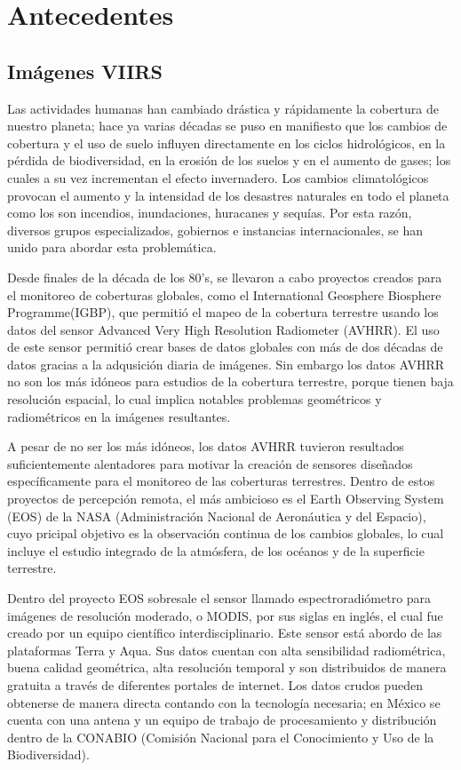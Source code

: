 \chapter{Antecedentes}

\section{Imágenes VIIRS}

Las actividades humanas han cambiado drástica y rápidamente la cobertura de nuestro planeta; hace ya varias décadas se puso en manifiesto que los cambios de cobertura y el uso de suelo influyen directamente en los ciclos hidrológicos, en la pérdida de biodiversidad, en la erosión de los suelos y en el aumento de gases; los cuales a su vez incrementan el efecto invernadero. Los cambios climatológicos provocan el aumento y la intensidad de los desastres naturales en todo el planeta como los son incendios, inundaciones, huracanes y sequías. Por esta razón, diversos grupos especializados, gobiernos e instancias internacionales, se han unido para abordar esta problemática. 

Desde finales de la década de los 80's, se llevaron a cabo proyectos creados para el monitoreo de coberturas globales, como el International Geosphere Biosphere Programme(IGBP), que permitió el mapeo de la cobertura terrestre usando los datos del sensor Advanced Very High Resolution Radiometer (AVHRR). El uso de este sensor permitió crear bases de datos globales con más de dos décadas de datos gracias a la adqusición diaria de imágenes. Sin embargo los datos AVHRR no son los más idóneos para estudios de la cobertura terrestre, porque tienen baja resolución espacial, lo cual implica notables problemas geométricos y radiométricos en la imágenes resultantes. 

A pesar de no ser los más idóneos, los datos AVHRR tuvieron resultados suficientemente alentadores para motivar la creación de sensores diseñados específicamente para el monitoreo de las coberturas terrestres. Dentro de estos proyectos de percepción remota, el más ambicioso es el Earth Observing System (EOS) de la NASA (Administración Nacional de Aeronáutica y del Espacio), cuyo pricipal objetivo es la observación continua de los cambios globales, lo cual incluye el estudio integrado de la atmósfera, de los océanos y de la superficie terrestre. 

Dentro del proyecto EOS sobresale el sensor llamado espectroradiómetro para imágenes de resolución moderado, o MODIS, por sus siglas en inglés, el cual fue creado por un equipo científico interdisciplinario. Este sensor está abordo de las plataformas Terra y Aqua. Sus datos cuentan con alta sensibilidad radiométrica, buena calidad geométrica, alta resolución temporal y son distribuidos de manera gratuita a través de diferentes portales de internet. Los datos crudos pueden obtenerse de manera directa contando con la tecnología necesaria; en México se cuenta con una antena y un equipo de trabajo de procesamiento y distribución dentro de la CONABIO (Comisión Nacional para el Conocimiento y Uso de la Biodiversidad). 

